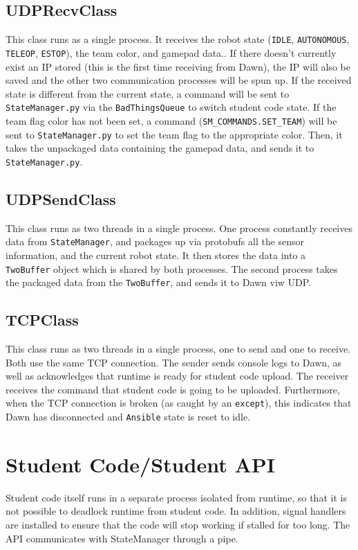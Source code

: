 \documentclass[12pt]{book}
\begin{document}
\subsection{UDPRecvClass}\label{udprecvclass}

This class runs as a single process. It receives the robot state
(\texttt{IDLE}, \texttt{AUTONOMOUS}, \texttt{TELEOP}, \texttt{ESTOP}),
the team color, and gamepad data.. If there doesn't currently exist an
IP stored (this is the first time receiving from Dawn), the IP will also
be saved and the other two communication processes will be spun up. If
the received state is different from the current state, a command will
be sent to \texttt{StateManager.py} via the \texttt{BadThingsQueue} to
switch student code state. If the team flag color has not been set, a
command (\texttt{SM\_COMMANDS.SET\_TEAM}) will be sent to
\texttt{StateManager.py} to set the team flag to the appropriate color.
Then, it takes the unpackaged data containing the gamepad data, and
sends it to \texttt{StateManager.py}.

\subsection{UDPSendClass}\label{udpsendclass}

This class runs as two threads in a single process. One process
constantly receives data from \texttt{StateManager}, and packages up via
protobufs all the sensor information, and the current robot state. It
then stores the data into a\\
\texttt{TwoBuffer} object which is shared by both processes. The second
process takes the packaged data from the \texttt{TwoBuffer}, and sends
it to Dawn viw UDP.

\subsection{TCPClass}\label{tcpclass}

This class runs as two threads in a single process, one to send and one
to receive. Both use the same TCP connection. The sender sends console
logs to Dawn, as well as acknowledges that runtime is ready for student
code upload. The receiver receives the command that student code is
going to be uploaded. Furthermore, when the TCP connection is broken (as
caught by an \texttt{except}), this indicates that Dawn has disconnected
and \texttt{Ansible} state is reset to idle.

\section{Student Code/Student API}
Student code itself runs in a separate process isolated from runtime, so that
it is not possible to deadlock runtime from student code. In addition,
signal handlers are installed to ensure that the code will stop
working if stalled for too long. The API communicates with StateManager
through a pipe.
\end{document}
